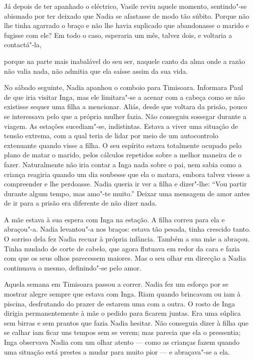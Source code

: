 Já depois de ter apanhado o eléctrico, Vasile reviu aquele momento,
sentindo"-se abismado por ter deixado que Nadia se afastasse de modo tão
súbito. Porque não lhe tinha agarrado o braço e não lhe havia suplicado
que abandonasse o marido e fugisse com ele? Em todo o caso, esperaria um
mês, talvez dois, e voltaria a contactá"-la,

porque na parte mais inabalável do seu ser, naquele canto da alma onde a
razão não valia nada, não admitia que ela saísse assim da sua vida.

No sábado seguinte, Nadia apanhou o comboio para Timisoara. Informara
Paul de que iria visitar Inga, mas ele limitara"-se a acenar com a cabeça
como se não existisse sequer uma filha a mencionar. Aliás, desde que
voltara da prisão, pouco se interessava pelo que a própria mulher fazia.
Não conseguiu sossegar durante a viagem. As estações sucediam"-se,
indistintas. Estava a viver uma situação de tensão extrema, com a qual
teria de lidar por meio de um autocontrolo extenuante quando visse a
filha. O seu espírito estava totalmente ocupado pelo plano de matar o
marido, pelos cálculos repetidos sobre a melhor maneira de o fazer.
Naturalmente não iria contar a Inga nada sobre o pai, nem sabia como a
criança reagiria quando um dia soubesse que ela o matara, embora talvez
viesse a compreender e lhe perdoasse. Nadia queria ir ver a filha e
dizer"-lhe: ``Vou partir durante algum tempo, mas amo"-te muito.'' Deixar
uma mensagem de amor antes de ir para a
prisão era diferente de não dizer nada.

A mãe estava à sua espera com Inga na estação. A filha correu para ela e
abraçou"-a. Nadia levantou"-a nos braços: estava tão pesada, tinha
crescido tanto. O sorriso dela fez Nadia recuar à própria infância.
Também a sua mãe a abraçou. Tinha mudado de corte de cabelo, que agora
flutuava em redor da cara e fazia com que os seus olhos parecessem
maiores. Mas o seu olhar em direcção a Nadia continuava o mesmo,
definindo"-se pelo amor.

Aquela semana em Timisoara passou a correr. Nadia fez um esforço por se
mostrar alegre sempre que estava com Inga. Riam quando brincavam ou iam
à piscina, desfrutando do prazer de estarem uma com a outra. O rosto
de Inga dirigia permanentemente à mãe o pedido para ficarem juntas.
Era uma súplica sem birras e sem prantos que fazia Nadia hesitar. Não
conseguia dizer à filha que se calhar iam ficar uns tempos sem se verem;
mas parecia que ela o pressentia; Inga observava Nadia com um olhar
atento --- como as crianças fazem quando uma situação está prestes a
mudar para muito pior --- e abraçava"-se a ela.

